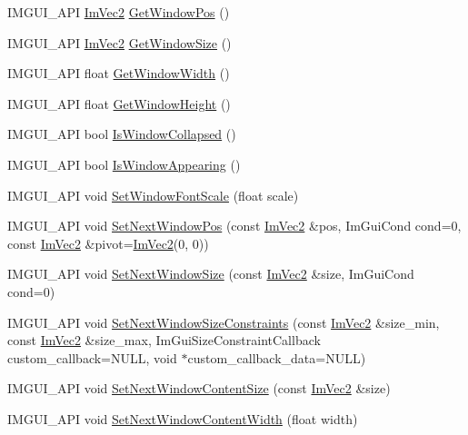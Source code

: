 \begin{DoxyCompactItemize}
\item 
I\+M\+G\+U\+I\+\_\+\+A\+PI \hyperlink{struct_im_vec2}{Im\+Vec2} \hyperlink{namespace_im_gui_a413d939f3ef416a47d6e5b48be955146}{Get\+Window\+Pos} ()
\item 
I\+M\+G\+U\+I\+\_\+\+A\+PI \hyperlink{struct_im_vec2}{Im\+Vec2} \hyperlink{namespace_im_gui_aaa5c0bfac7125ba9850a08b6db2e90c9}{Get\+Window\+Size} ()
\item 
I\+M\+G\+U\+I\+\_\+\+A\+PI float \hyperlink{namespace_im_gui_a471ff23945b99541c506dbdc2a9004cf}{Get\+Window\+Width} ()
\item 
I\+M\+G\+U\+I\+\_\+\+A\+PI float \hyperlink{namespace_im_gui_a44d2bfb80e0d2dd232a553ab29a91b52}{Get\+Window\+Height} ()
\item 
I\+M\+G\+U\+I\+\_\+\+A\+PI bool \hyperlink{namespace_im_gui_a2a6492aea9013c0078fc530a66e11768}{Is\+Window\+Collapsed} ()
\item 
I\+M\+G\+U\+I\+\_\+\+A\+PI bool \hyperlink{namespace_im_gui_a99fd14154aae264087d471132e56a42e}{Is\+Window\+Appearing} ()
\item 
I\+M\+G\+U\+I\+\_\+\+A\+PI void \hyperlink{namespace_im_gui_a11f2f343dbc9b00ccd9e99ebd59cfe8b}{Set\+Window\+Font\+Scale} (float scale)
\item 
I\+M\+G\+U\+I\+\_\+\+A\+PI void \hyperlink{namespace_im_gui_afbccd31113430670b5ab2bf0d6f509bf}{Set\+Next\+Window\+Pos} (const \hyperlink{struct_im_vec2}{Im\+Vec2} \&pos, Im\+Gui\+Cond cond=0, const \hyperlink{struct_im_vec2}{Im\+Vec2} \&pivot=\hyperlink{struct_im_vec2}{Im\+Vec2}(0, 0))
\item 
I\+M\+G\+U\+I\+\_\+\+A\+PI void \hyperlink{namespace_im_gui_ab33717bb71ef5e393ae18656fc6b229d}{Set\+Next\+Window\+Size} (const \hyperlink{struct_im_vec2}{Im\+Vec2} \&size, Im\+Gui\+Cond cond=0)
\item 
I\+M\+G\+U\+I\+\_\+\+A\+PI void \hyperlink{namespace_im_gui_a06f40aaf9cf2539c8dba43156a131e45}{Set\+Next\+Window\+Size\+Constraints} (const \hyperlink{struct_im_vec2}{Im\+Vec2} \&size\+\_\+min, const \hyperlink{struct_im_vec2}{Im\+Vec2} \&size\+\_\+max, Im\+Gui\+Size\+Constraint\+Callback custom\+\_\+callback=N\+U\+LL, void $\ast$custom\+\_\+callback\+\_\+data=N\+U\+LL)
\item 
I\+M\+G\+U\+I\+\_\+\+A\+PI void \hyperlink{namespace_im_gui_aae55a58c38d8e84b10eb1e8b1531372d}{Set\+Next\+Window\+Content\+Size} (const \hyperlink{struct_im_vec2}{Im\+Vec2} \&size)
\item 
I\+M\+G\+U\+I\+\_\+\+A\+PI void \hyperlink{namespace_im_gui_a94731b8482ed9298a9ac454061e79e8a}{Set\+Next\+Window\+Content\+Width} (float width)

\end{DoxyCompactItemize}
